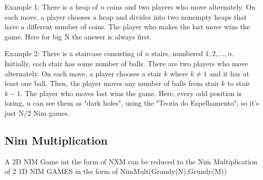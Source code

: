         Example 1: There is a heap of $n$ coins and two players who move alternately. On each move, a player chooses a heap and divides into two nonempty heaps that have a different number of coins. The player who makes the last move wins the game. Here for big N the answer is always first.

        

        Example 2: There is a staircase consisting of $n$ stairs, numbered $1,2,\ldots,n$. Initially, each stair has some number of balls. There are two players who move alternately. On each move, a player chooses a stair $k$ where $k\neq1$ and it has at least one ball. Then, the player moves any number of balls from stair $k$ to stair $k-1$. The player who moves last wins the game. Here, every odd position is losing, u can see them as "dark holes", using the "Teoria do Espelhamento", so it's just N/2 Nim games.

        

    \subsection{Nim Multiplication}
        A 2D NIM Game int the form of NXM can be reduced
        to the Nim Multiplication of 2 1D NIM GAMES
        in the form of NimMult(Grundy(N),Grundy(M))
        

